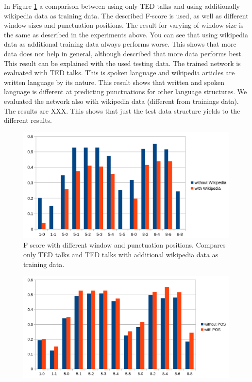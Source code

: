 In Figure \ref{fig:window_wiki_eval} a comparison between using only TED talks and using additionally wikipedia data as training data.
The described F-score is used, as well as different window sizes and punctuation positions. 
The result for varying of window size is the same as described in the experiments above. 
You can see that using wikipedia data as additional training data always performs worse.
This shows that more data does not help in general, although %
 described that more data performs best.
This result can be explained with the used testing data. 
The trained network is evaluated with TED talks.
This is spoken language and wikipedia articles are written language by its nature. 
This result shows that written and spoken language is different at predicting punctuations for other language structures.
We evaluated the network also with wikipedia data (different from trainings data). The results are XXX.
This shows that just the test data structure yields to the different results.

\begin{figure}[ht]
    \centering
    \includegraphics[width=\textwidth]{img/window_wiki_eval.png}
    \caption{F score with different window and punctuation positions. Compares only TED talks and TED talks with additional wikipedia data as training data.}
    \label{fig:window_wiki_eval}
\end{figure}

\begin{figure}[ht]
    \centering
    \includegraphics[width=\textwidth]{img/window_pos_eval.png}
    \caption{}
    \label{fig:window_pos_eval}
\end{figure}

